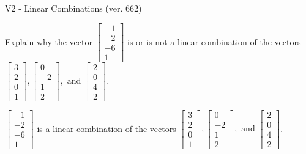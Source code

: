 \begin{exercise}
  \begin{exerciseTitle}V2 - Linear Combinations (ver. 662)\end{exerciseTitle}
  \begin{exerciseStatement}
    Explain why the vector \(\left[\begin{array}{c}
-1 \\
-2 \\
-6 \\
1
\end{array}\right]\)  is or is not a linear 
	combination of the vectors \(\left[\begin{array}{c}
3 \\
2 \\
0 \\
1
\end{array}\right] , \left[\begin{array}{c}
0 \\
-2 \\
1 \\
2
\end{array}\right] , \text{ and } \left[\begin{array}{c}
2 \\
0 \\
4 \\
2
\end{array}\right]\).
	


  \end{exerciseStatement}
  \begin{exerciseAnswer}
   \(\left[\begin{array}{c}
-1 \\
-2 \\
-6 \\
1
\end{array}\right]\) 
  	 is  
	a linear combination of the vectors \(\left[\begin{array}{c}
3 \\
2 \\
0 \\
1
\end{array}\right] , \left[\begin{array}{c}
0 \\
-2 \\
1 \\
2
\end{array}\right] , \text{ and } \left[\begin{array}{c}
2 \\
0 \\
4 \\
2
\end{array}\right]\).

	
  


  \end{exerciseAnswer}
\end{exercise}